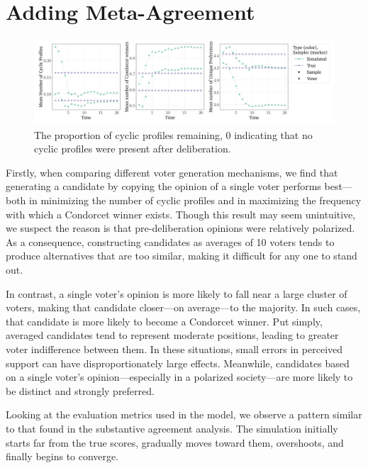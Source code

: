 \section{Adding Meta-Agreement}

\begin{figure}[htbp]
	\centering
	\centering
	\includegraphics[width=\textwidth]{Figures/three_measures.png
	}
	\caption{The proportion of cyclic profiles remaining, 0 indicating that no cyclic profiles were present after deliberation.}
	\label{fig:degroot_cyclic}
\end{figure}

Firstly, when comparing different voter generation mechanisms, we find that generating a candidate by copying the opinion of a single voter performs best—both in minimizing the number of cyclic profiles and in maximizing the frequency with which a Condorcet winner exists. Though this result may seem unintuitive, we suspect the reason is that pre-deliberation opinions were relatively polarized. As a consequence, constructing candidates as averages of 10 voters tends to produce alternatives that are too similar, making it difficult for any one to stand out.

In contrast, a single voter's opinion is more likely to fall near a large cluster of voters, making that candidate closer—on average—to the majority. In such cases, that candidate is more likely to become a Condorcet winner. Put simply, averaged candidates tend to represent moderate positions, leading to greater voter indifference between them. In these situations, small errors in perceived support can have disproportionately large effects. Meanwhile, candidates based on a single voter's opinion—especially in a polarized society—are more likely to be distinct and strongly preferred.

Looking at the evaluation metrics used in the model, we observe a pattern similar to that found in the substantive agreement analysis. The simulation initially starts far from the true scores, gradually moves toward them, overshoots, and finally begins to converge.


